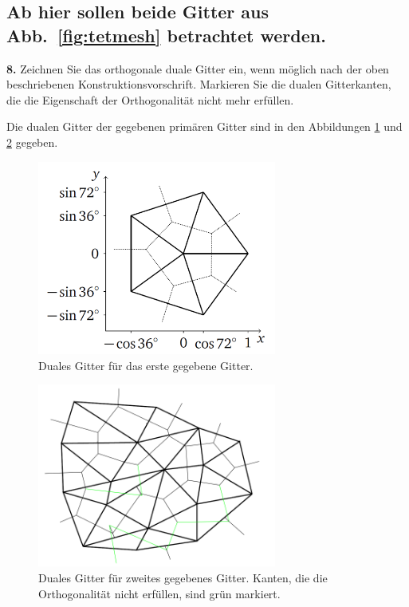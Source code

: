 \documentclass[Protokollheft.tex]{subfiles}
\begin{document}
    \subsection{Ab hier sollen beide Gitter aus Abb.~\ref{fig:tetmesh} betrachtet werden.}

        \begin{framed}
	\noindent \textbf{8.} Zeichnen Sie das orthogonale duale
        Gitter ein, wenn möglich nach der oben beschriebenen
        Konstruktionsvorschrift. Markieren Sie die dualen
        Gitterkanten, die die Eigenschaft der Orthogonalität nicht mehr
        erfüllen.\label{exer:drawDualGrid}
\end{framed}
	Die dualen Gitter der gegebenen primären Gitter sind in den Abbildungen \ref{Abb:dual_1} und \ref{Abb:dual_2} gegeben.
\begin{figure}[h]
	\centering
	\includegraphics[width=0.7\textwidth]{Duales_Gitter_1.png}
	\caption{Duales Gitter für das erste gegebene Gitter.}
	\label{Abb:dual_1}
\end{figure}

\begin{figure}[h]
	\centering
	\includegraphics[width=0.7\textwidth]{Duales_Gitter_2.png}
	\caption{Duales Gitter für zweites gegebenes Gitter. Kanten, die die Orthogonalität nicht erfüllen, sind grün markiert.}
	\label{Abb:dual_2}
\end{figure}
\end{document}
